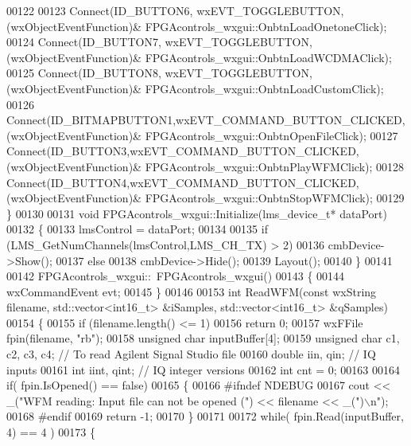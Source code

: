 \begin{DoxyCode}
{00122 
00123     Connect(ID\_BUTTON6, wxEVT\_TOGGLEBUTTON, (wxObjectEventFunction)&
      FPGAcontrols_wxgui::OnbtnLoadOnetoneClick);
00124     Connect(ID\_BUTTON7, wxEVT\_TOGGLEBUTTON, (wxObjectEventFunction)&
      FPGAcontrols_wxgui::OnbtnLoadWCDMAClick);
00125     Connect(ID\_BUTTON8, wxEVT\_TOGGLEBUTTON, (wxObjectEventFunction)&
      FPGAcontrols_wxgui::OnbtnLoadCustomClick);
00126     Connect(ID\_BITMAPBUTTON1,wxEVT\_COMMAND\_BUTTON\_CLICKED,(wxObjectEventFunction)&
      FPGAcontrols_wxgui::OnbtnOpenFileClick);
00127     Connect(ID\_BUTTON3,wxEVT\_COMMAND\_BUTTON\_CLICKED,(wxObjectEventFunction)&
      FPGAcontrols_wxgui::OnbtnPlayWFMClick);
00128     Connect(ID\_BUTTON4,wxEVT\_COMMAND\_BUTTON\_CLICKED,(wxObjectEventFunction)&
      FPGAcontrols_wxgui::OnbtnStopWFMClick);
00129 \}
00130 
00131 \textcolor{keywordtype}{void} FPGAcontrols_wxgui::Initialize(lms_device_t* dataPort)
00132 \{
00133     lmsControl = dataPort;
00134     
00135     \textcolor{keywordflow}{if} (LMS_GetNumChannels(lmsControl,LMS_CH_TX) > 2)
00136         cmbDevice->Show();
00137     \textcolor{keywordflow}{else}
00138         cmbDevice->Hide();
00139     Layout();
00140 \}
00141 
00142 FPGAcontrols_wxgui::~FPGAcontrols_wxgui()
00143 \{
00144     wxCommandEvent evt;
00145 \}
00146 
00153 \textcolor{keywordtype}{int} ReadWFM(\textcolor{keyword}{const} wxString filename, std::vector<int16\_t> &iSamples, std::vector<int16\_t> &qSamples)
00154 \{
00155     \textcolor{keywordflow}{if} (filename.length() <= 1)
00156         \textcolor{keywordflow}{return} 0;
00157     wxFFile fpin(filename, \textcolor{stringliteral}{"rb"});
00158     \textcolor{keywordtype}{unsigned} \textcolor{keywordtype}{char} inputBuffer[4];
00159     \textcolor{keywordtype}{unsigned} \textcolor{keywordtype}{char} c1, c2, c3, c4; \textcolor{comment}{// To read Agilent Signal Studio file}
00160     \textcolor{keywordtype}{double} iin, qin; \textcolor{comment}{// IQ inputs}
00161     \textcolor{keywordtype}{int} iint, qint; \textcolor{comment}{// IQ integer versions}
00162     \textcolor{keywordtype}{int} cnt = 0;
00163 
00164     \textcolor{keywordflow}{if}( fpin.IsOpened() == \textcolor{keyword}{false})
00165     \{
00166 \textcolor{preprocessor}{#ifndef NDEBUG}
00167         cout << \_(\textcolor{stringliteral}{"WFM reading: Input file can not be opened ("}) << filename << \_(\textcolor{stringliteral}{")\(\backslash\)n"});
00168 \textcolor{preprocessor}{#endif}
00169         \textcolor{keywordflow}{return} -1;
00170     \}
00171 
00172     \textcolor{keywordflow}{while}( fpin.Read(inputBuffer, 4) == 4 )
00173     \{
}
\end{DoxyCode}
